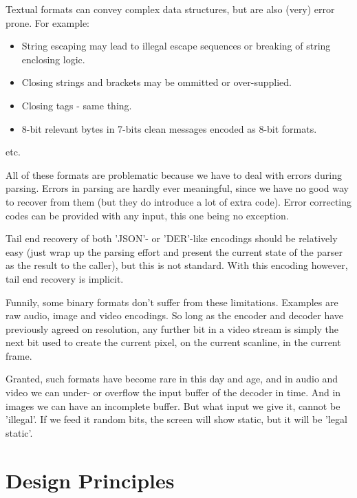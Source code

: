 Textual formats can convey complex data structures, but are also
(very) error prone. For example:

\begin{itemize}
\item String escaping may lead to illegal escape sequences or breaking
  of string enclosing logic.
\item Closing strings and brackets may be ommitted or over-supplied.
\item Closing tags - same thing.
\item 8-bit relevant bytes in 7-bits clean messages encoded as 8-bit formats.
\end{itemize}
etc.

All of these formats are problematic because we have to deal with
errors during parsing. Errors in parsing are hardly ever meaningful,
since we have no good way to recover from them (but they do introduce
a lot of extra code). Error correcting codes can be provided with any input,
this one being no exception.

Tail end recovery of both 'JSON'- or 'DER'-like encodings should be
relatively easy (just wrap up the parsing effort and present the current
state of the parser as the result to the caller), but this is not standard.
With this encoding however, tail end recovery is implicit.

Funnily, some binary formats don't suffer from these limitations.
Examples are raw audio, image and video encodings. So long as the
encoder and decoder have previously agreed on resolution,
any further bit in a video stream is simply the next bit used to
create the current pixel, on the current scanline, in the current frame.

Granted, such formats have become rare in this day and age,
and in audio and video we can under- or overflow the input buffer of the
decoder in time. And in images we can have an incomplete buffer.
But what input we give it, cannot be 'illegal'. If we feed
it random bits, the screen will show static, but it will be 'legal static'.

\section{Design Principles}
 
